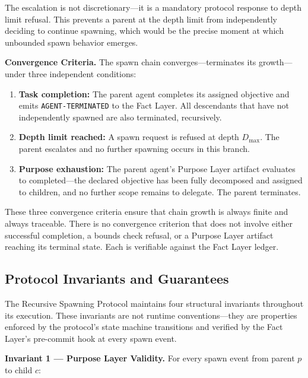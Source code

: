 The escalation is not discretionary—it is a mandatory protocol response to depth limit refusal. This prevents a parent at the depth limit from independently deciding to continue spawning, which would be the precise moment at which unbounded spawn behavior emerges.

\medskip
\noindent\textbf{Convergence Criteria.} The spawn chain converges—terminates its growth—under three independent conditions:

\begin{enumerate}
  \item[(CC-1)] \textbf{Task completion:} The parent agent completes its assigned objective and emits \texttt{AGENT-TERMINATED} to the Fact Layer. All descendants that have not independently spawned are also terminated, recursively.

  \item[(CC-2)] \textbf{Depth limit reached:} A spawn request is refused at depth $D_{\max}$. The parent escalates and no further spawning occurs in this branch.

  \item[(CC-3)] \textbf{Purpose exhaustion:} The parent agent's Purpose Layer artifact evaluates to completed—the declared objective has been fully decomposed and assigned to children, and no further scope remains to delegate. The parent terminates.
\end{enumerate}

These three convergence criteria ensure that chain growth is always finite and always traceable. There is no convergence criterion that does not involve either successful completion, a bounds check refusal, or a Purpose Layer artifact reaching its terminal state. Each is verifiable against the Fact Layer ledger.

\subsection{Protocol Invariants and Guarantees}

The Recursive Spawning Protocol maintains four structural invariants throughout its execution. These invariants are not runtime conventions—they are properties enforced by the protocol's state machine transitions and verified by the Fact Layer's pre-commit hook at every spawn event.

\bigskip
\noindent\textbf{Invariant 1 — Purpose Layer Validity.} For every spawn event from parent $p$ to child $c$:


